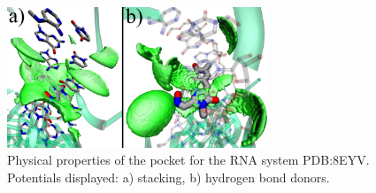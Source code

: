     \begin{figure}[H]
      \centering
      \includegraphics[width=0.7\textwidth]{figures/results/benchmark_rna/8eyv.png}
      \caption{\label{fig:benchmark/8eyv} Physical properties of the pocket for the RNA system PDB:8EYV. Potentials displayed: a) stacking, b) hydrogen bond donors.}
    \end{figure}


